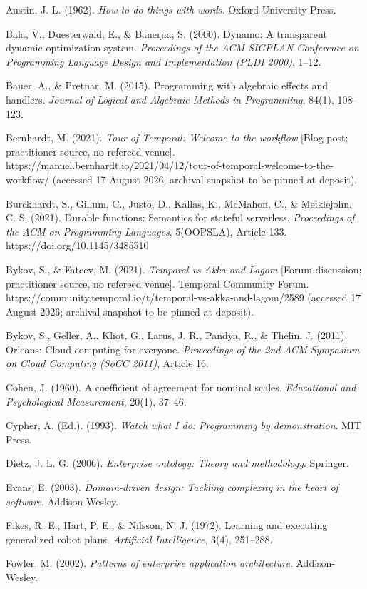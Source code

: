 \documentclass[
]{article}
\begin{document}
Austin, J. L. (1962). \emph{How to do things with words}. Oxford
University Press.

Bala, V., Duesterwald, E., \& Banerjia, S. (2000). Dynamo: A transparent
dynamic optimization system. \emph{Proceedings of the ACM SIGPLAN
Conference on Programming Language Design and Implementation (PLDI
2000)}, 1--12.

Bauer, A., \& Pretnar, M. (2015). Programming with algebraic effects and
handlers. \emph{Journal of Logical and Algebraic Methods in
Programming}, 84(1), 108--123.

Bernhardt, M. (2021). \emph{Tour of Temporal: Welcome to the workflow}
{[}Blog post; practitioner source, no refereed venue{]}.
https://manuel.bernhardt.io/2021/04/12/tour-of-temporal-welcome-to-the-workflow/
(accessed 17 August 2026; archival snapshot to be pinned at deposit).

Burckhardt, S., Gillum, C., Justo, D., Kallas, K., McMahon, C., \&
Meiklejohn, C. S. (2021). Durable functions: Semantics for stateful
serverless. \emph{Proceedings of the ACM on Programming Languages},
5(OOPSLA), Article 133. https://doi.org/10.1145/3485510

Bykov, S., \& Fateev, M. (2021). \emph{Temporal vs Akka and Lagom}
{[}Forum discussion; practitioner source, no refereed venue{]}. Temporal
Community Forum.
https://community.temporal.io/t/temporal-vs-akka-and-lagom/2589
(accessed 17 August 2026; archival snapshot to be pinned at deposit).

Bykov, S., Geller, A., Kliot, G., Larus, J. R., Pandya, R., \& Thelin,
J. (2011). Orleans: Cloud computing for everyone. \emph{Proceedings of
the 2nd ACM Symposium on Cloud Computing (SoCC 2011)}, Article 16.

Cohen, J. (1960). A coefficient of agreement for nominal scales.
\emph{Educational and Psychological Measurement}, 20(1), 37--46.

Cypher, A. (Ed.). (1993). \emph{Watch what I do: Programming by
demonstration}. MIT Press.

Dietz, J. L. G. (2006). \emph{Enterprise ontology: Theory and
methodology}. Springer.

Evans, E. (2003). \emph{Domain-driven design: Tackling complexity in the
heart of software}. Addison-Wesley.

Fikes, R. E., Hart, P. E., \& Nilsson, N. J. (1972). Learning and
executing generalized robot plans. \emph{Artificial Intelligence}, 3(4),
251--288.

Fowler, M. (2002). \emph{Patterns of enterprise application
architecture}. Addison-Wesley.
\end{document}

